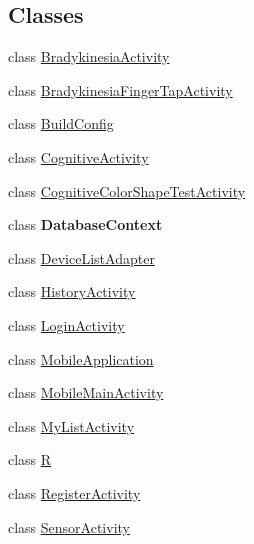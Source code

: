\subsection*{Classes}
\begin{DoxyCompactItemize}
\item 
class \hyperlink{classcom_1_1example_1_1android_1_1wearable_1_1wcldemo_1_1BradykinesiaActivity}{Bradykinesia\+Activity}
\item 
class \hyperlink{classcom_1_1example_1_1android_1_1wearable_1_1wcldemo_1_1BradykinesiaFingerTapActivity}{Bradykinesia\+Finger\+Tap\+Activity}
\item 
class \hyperlink{classcom_1_1example_1_1android_1_1wearable_1_1wcldemo_1_1BuildConfig}{Build\+Config}
\item 
class \hyperlink{classcom_1_1example_1_1android_1_1wearable_1_1wcldemo_1_1CognitiveActivity}{Cognitive\+Activity}
\item 
class \hyperlink{classcom_1_1example_1_1android_1_1wearable_1_1wcldemo_1_1CognitiveColorShapeTestActivity}{Cognitive\+Color\+Shape\+Test\+Activity}
\item 
class {\bfseries Database\+Context}
\item 
class \hyperlink{classcom_1_1example_1_1android_1_1wearable_1_1wcldemo_1_1DeviceListAdapter}{Device\+List\+Adapter}
\item 
class \hyperlink{classcom_1_1example_1_1android_1_1wearable_1_1wcldemo_1_1HistoryActivity}{History\+Activity}
\item 
class \hyperlink{classcom_1_1example_1_1android_1_1wearable_1_1wcldemo_1_1LoginActivity}{Login\+Activity}
\item 
class \hyperlink{classcom_1_1example_1_1android_1_1wearable_1_1wcldemo_1_1MobileApplication}{Mobile\+Application}
\item 
class \hyperlink{classcom_1_1example_1_1android_1_1wearable_1_1wcldemo_1_1MobileMainActivity}{Mobile\+Main\+Activity}
\item 
class \hyperlink{classcom_1_1example_1_1android_1_1wearable_1_1wcldemo_1_1MyListActivity}{My\+List\+Activity}
\item 
class \hyperlink{classcom_1_1example_1_1android_1_1wearable_1_1wcldemo_1_1R}{R}
\item 
class \hyperlink{classcom_1_1example_1_1android_1_1wearable_1_1wcldemo_1_1RegisterActivity}{Register\+Activity}
\item 
class \hyperlink{classcom_1_1example_1_1android_1_1wearable_1_1wcldemo_1_1SensorActivity}{Sensor\+Activity}
\item 

\end{DoxyCompactItemize}
